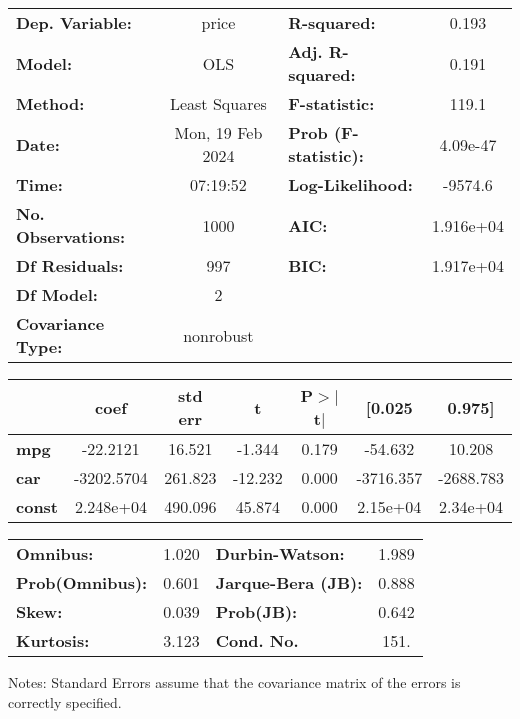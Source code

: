 \begin{center}
\begin{tabular}{lclc}
\toprule
\textbf{Dep. Variable:}    &      price       & \textbf{  R-squared:         } &     0.193   \\
\textbf{Model:}            &       OLS        & \textbf{  Adj. R-squared:    } &     0.191   \\
\textbf{Method:}           &  Least Squares   & \textbf{  F-statistic:       } &     119.1   \\
\textbf{Date:}             & Mon, 19 Feb 2024 & \textbf{  Prob (F-statistic):} &  4.09e-47   \\
\textbf{Time:}             &     07:19:52     & \textbf{  Log-Likelihood:    } &   -9574.6   \\
\textbf{No. Observations:} &        1000      & \textbf{  AIC:               } & 1.916e+04   \\
\textbf{Df Residuals:}     &         997      & \textbf{  BIC:               } & 1.917e+04   \\
\textbf{Df Model:}         &           2      & \textbf{                     } &             \\
\textbf{Covariance Type:}  &    nonrobust     & \textbf{                     } &             \\
\bottomrule
\end{tabular}
\begin{tabular}{lcccccc}
               & \textbf{coef} & \textbf{std err} & \textbf{t} & \textbf{P$> |$t$|$} & \textbf{[0.025} & \textbf{0.975]}  \\
\midrule
\textbf{mpg}   &     -22.2121  &       16.521     &    -1.344  &         0.179        &      -54.632    &       10.208     \\
\textbf{car}   &   -3202.5704  &      261.823     &   -12.232  &         0.000        &    -3716.357    &    -2688.783     \\
\textbf{const} &    2.248e+04  &      490.096     &    45.874  &         0.000        &     2.15e+04    &     2.34e+04     \\
\bottomrule
\end{tabular}
\begin{tabular}{lclc}
\textbf{Omnibus:}       &  1.020 & \textbf{  Durbin-Watson:     } &    1.989  \\
\textbf{Prob(Omnibus):} &  0.601 & \textbf{  Jarque-Bera (JB):  } &    0.888  \\
\textbf{Skew:}          &  0.039 & \textbf{  Prob(JB):          } &    0.642  \\
\textbf{Kurtosis:}      &  3.123 & \textbf{  Cond. No.          } &     151.  \\
\bottomrule
\end{tabular}
\end{center}

Notes: \newline
 [1] Standard Errors assume that the covariance matrix of the errors is correctly specified.